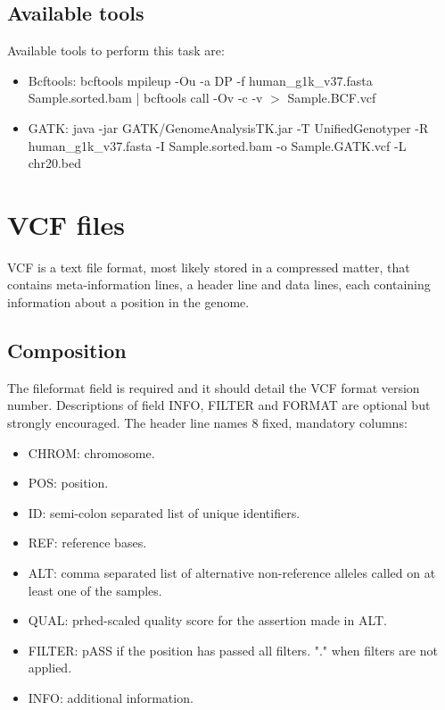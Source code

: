 	\subsection{Available tools}
	Available tools to perform this task are:

	\begin{itemize}
		\item Bcftools: bcftools mpileup -Ou -a DP -f human\_g1k\_v37.fasta Sample.sorted.bam | bcftools call -Ov -c -v $>$ Sample.BCF.vcf
		\item GATK: java -jar GATK/GenomeAnalysisTK.jar -T UnifiedGenotyper -R human\_g1k\_v37.fasta -I Sample.sorted.bam -o Sample.GATK.vcf -L chr20.bed
	\end{itemize}

\section{VCF files}
VCF is a text file format, most likely stored in a compressed matter, that contains meta-information lines, a header line and data lines, each containing information about a position in the genome.

	\subsection{Composition}
	The fileformat field is required and it should detail the VCF format version number.
	Descriptions of field INFO, FILTER and FORMAT are optional but strongly encouraged.
	The header line names $8$ fixed, mandatory columns:

	\begin{multicols}{2}
		\begin{itemize}
			\item CHROM: chromosome.
			\item POS: position.
			\item ID: semi-colon separated list of unique identifiers.
			\item REF: reference bases.
			\item ALT: comma separated list of alternative non-reference alleles called on at least one of the samples.
			\item QUAL: prhed-scaled quality score for the assertion made in ALT.
			\item FILTER: pASS if the position has passed all filters.
				"." when filters are not applied.
			\item INFO: additional information.
		\end{itemize}
	\end{multicols}

